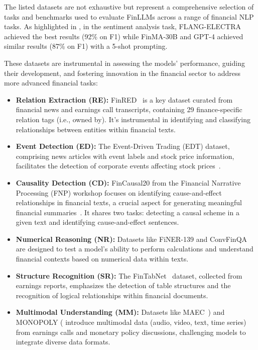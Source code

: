 The listed datasets are not exhaustive but represent a comprehensive selection of tasks and benchmarks used to evaluate FinLLMs across a range of financial NLP tasks.
As highlighted in \textcite{lee2024survey}, in the sentiment analysis task, FLANG-ELECTRA achieved the best results (92\% on F1) while FinMA-30B and GPT-4 achieved similar results (87\% on F1) with a 5-shot prompting.

These datasets are instrumental in assessing the models' performance, guiding their development, and fostering innovation in the financial sector to address more advanced financial tasks:

\begin{itemize}
	\item \textbf{Relation Extraction (RE):} {FinRED~\cite{sharma2022finred} is a key dataset curated from financial news and earnings call transcripts, containing 29 finance-specific relation tags (i.e., owned by). It's instrumental in identifying and classifying relationships between entities within financial texts.}
	\item \textbf{Event Detection (ED):} The Event-Driven Trading (EDT) dataset, comprising news articles with event labels and stock price information, facilitates the detection of corporate events affecting stock prices~\cite{zhou2021trade}.
	\item \textbf{Causality Detection (CD):} {FinCausal20 from the Financial Narrative Processing (FNP) workshop focuses on identifying cause-and-effect relationships in financial texts, a crucial aspect for generating meaningful financial summaries~\cite{mariko2020financial}. It shares two tasks: detecting a causal scheme in a given text and identifying cause-and-effect sentences.}
	\item \textbf{Numerical Reasoning (NR):} Datasets like FiNER-139 and ConvFinQA are designed to test a model's ability to perform calculations and understand financial contexts based on numerical data within texts.
	\item \textbf{Structure Recognition (SR):} The FinTabNet~\cite{zheng2021global} dataset, collected from earnings reports, emphasizes the detection of table structures and the recognition of logical relationships within financial documents.
	\item \textbf{Multimodal Understanding (MM):} Datasets like MAEC~\cite{li2020maec}) and MONOPOLY (\textcite{mathur2022monopoly} introduce multimodal data (audio, video, text, time series) from earnings calls and monetary policy discussions, challenging models to integrate diverse data formats.

\end{itemize}
